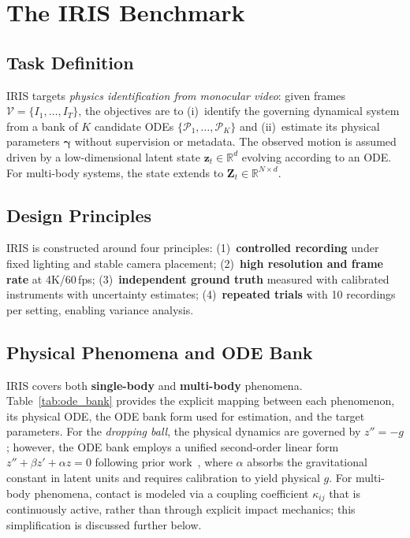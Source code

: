 \documentclass[runningheads]{llncs}
\begin{document}
\section{The IRIS Benchmark}
\label{sec:dataset}

\subsection{Task Definition}
\label{sec:task}

IRIS targets \emph{physics identification from monocular video}: given frames $\mathcal{V} = \{I_1, \ldots, I_T\}$, the objectives are to (i)~identify the governing dynamical system from a bank of $K$ candidate ODEs $\{\mathcal{P}_1, \ldots, \mathcal{P}_K\}$ and (ii)~estimate its physical parameters $\boldsymbol{\gamma}$ without supervision or metadata. The observed motion is assumed driven by a low-dimensional latent state $\mathbf{z}_t \in \mathbb{R}^d$ evolving according to an ODE. For multi-body systems, the state extends to $\mathbf{Z}_t \in \mathbb{R}^{N \times d}$.

\subsection{Design Principles}
\label{sec:dataset_design}

IRIS is constructed around four principles: (1)~\textbf{controlled recording} under fixed lighting and stable camera placement; (2)~\textbf{high resolution and frame rate} at 4K/60\,fps; (3)~\textbf{independent ground truth} measured with calibrated instruments with uncertainty estimates; (4)~\textbf{repeated trials} with 10 recordings per setting, enabling variance analysis.

\subsection{Physical Phenomena and ODE Bank}
\label{sec:dataset_phenomena}

IRIS covers both \textbf{single-body} and \textbf{multi-body} phenomena. Table~\ref{tab:ode_bank} provides the explicit mapping between each phenomenon, its physical ODE, the ODE bank form used for estimation, and the target parameters. For the \emph{dropping ball}, the physical dynamics are governed by $z'' = -g$; however, the ODE bank employs a unified second-order linear form $z'' + \beta z' + \alpha z = 0$ following prior work~\cite{hofherr2023neural, jaques2019physics}, where $\alpha$ absorbs the gravitational constant in latent units and requires calibration to yield physical $g$. For multi-body phenomena, contact is modeled via a coupling coefficient $\kappa_{ij}$ that is continuously active, rather than through explicit impact mechanics; this simplification is discussed further below.
\end{document}
